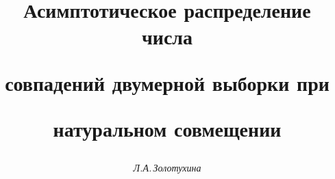 









\newcommand{\re}{\operatorname{Re}}


\newcommand{\tts}[1]{}




\renewcommand{\baselinestretch}{0.96}







\setcounter{page}{23}















\author{\it Л.А.\,Золотухина}




\title{Асимптотическое распределение числа


совпадений двумерной выборки при


натуральном совмещении}





\date{}




\pagestyle{plain} %







\maketitle



